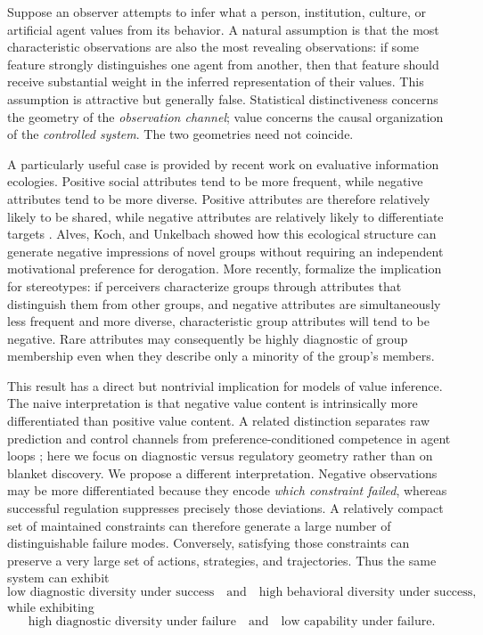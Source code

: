 \documentclass[11pt]{article}
\begin{document}
Suppose an observer attempts to infer what a person, institution, culture, or artificial agent values from its behavior. A natural assumption is that the most characteristic observations are also the most revealing observations: if some feature strongly distinguishes one agent from another, then that feature should receive substantial weight in the inferred representation of their values. This assumption is attractive but generally false. Statistical distinctiveness concerns the geometry of the \emph{observation channel}; value concerns the causal organization of the \emph{controlled system}. The two geometries need not coincide.

A particularly useful case is provided by recent work on evaluative information ecologies. Positive social attributes tend to be more frequent, while negative attributes tend to be more diverse. Positive attributes are therefore relatively likely to be shared, while negative attributes are relatively likely to differentiate targets \citep{AlvesKochUnkelbach2017Common,AlvesKochUnkelbach2017Good,UnkelbachKochAlves2019}. Alves, Koch, and Unkelbach \citeyearpar{AlvesKochUnkelbach2018} showed how this ecological structure can generate negative impressions of novel groups without requiring an independent motivational preference for derogation. More recently, \citet{UnkelbachWeitzelAlves2026} formalize the implication for stereotypes: if perceivers characterize groups through attributes that distinguish them from other groups, and negative attributes are simultaneously less frequent and more diverse, characteristic group attributes will tend to be negative. Rare attributes may consequently be highly diagnostic of group membership even when they describe only a minority of the group's members.

This result has a direct but nontrivial implication for models of value inference. The naive interpretation is that negative value content is intrinsically more differentiated than positive value content. A related distinction separates raw prediction and control channels from preference-conditioned competence in agent loops \citep{zarncke2025preference}; here we focus on diagnostic versus regulatory geometry rather than on blanket discovery. We propose a different interpretation. Negative observations may be more differentiated because they encode \emph{which constraint failed}, whereas successful regulation suppresses precisely those deviations. A relatively compact set of maintained constraints can therefore generate a large number of distinguishable failure modes. Conversely, satisfying those constraints can preserve a very large set of actions, strategies, and trajectories. Thus the same system can exhibit
\begin{equation}
    \text{low diagnostic diversity under success}
    \quad\text{and}\quad
    \text{high behavioral diversity under success},
\end{equation}
while exhibiting
\begin{equation}
    \text{high diagnostic diversity under failure}
    \quad\text{and}\quad
    \text{low capability under failure}.
\end{equation}
\end{document}
